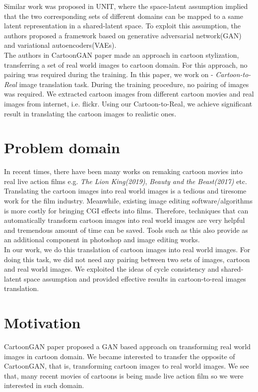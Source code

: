 Similar work was proposed in UNIT\cite{DBLP:journals/corr/LiuBK17}, where the space-latent assumption implied that the two corresponding sets of different domains can be mapped to a same latent representation in a shared-latent space. To exploit this assumption, the authors proposed a framework based on generative adversarial network(GAN) and variational autoencoders(VAEs).\\
The authors in CartoonGAN\cite{cartoonGAN} paper made an approach in cartoon stylization, transferring a set of real world images to cartoon domain. For this approach, no pairing was required during the training. In this paper, we work on - \textit{Cartoon-to-Real} image translation task. During the training procedure, no pairing of images was required. We extracted cartoon images from different cartoon movies and real images from internet, i.e. flickr. Using our Cartoon-to-Real, we achieve significant result in translating the cartoon images to realistic ones.   

\section{Problem domain}
In recent times, there have been many works on remaking cartoon movies into real live action films e.g. \textit{The Lion King(2019)}, \textit{Beauty and the Beast(2017)} etc. Translating the cartoon images into real world images is a tedious and tiresome work for the film industry. Meanwhile, existing image editing software/algorithms is more costly for bringing CGI effects into films. Therefore, techniques that can automatically transform cartoon images into real world images are very helpful and tremendous amount of time can be saved. Tools such as this also provide as an additional component in photoshop and image editing works. \\
In our work, we do this translation of cartoon images into real world images. For doing this task, we did not need any pairing between two sets of images, cartoon and real world images. We exploited the ideas of cycle consistency\cite{cyclegan} and shared-latent space assumption\cite{DBLP:journals/corr/LiuBK17} and provided effective results in cartoon-to-real images translation.  

\section{Motivation}
CartoonGAN\cite{cartoonGAN} paper proposed a GAN based approach on transforming real world images in cartoon domain. We became interested to transfer the opposite of CartoonGAN, that is, transforming cartoon images to real world images. We see that, many recent movies of cartoons is being made live action film so we were interested in such domain.

